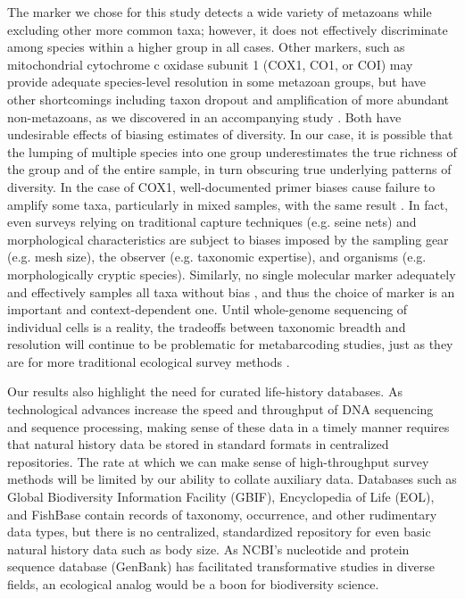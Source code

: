 \documentclass[11pt,letterpaper]{article} %
\begin{document}
The marker we chose for this study detects a wide variety of metazoans while excluding other more common taxa; however, it does not effectively discriminate among species within a higher group in all cases.
Other markers, such as mitochondrial cytochrome c oxidase subunit 1 (COX1, CO1, or COI) may provide adequate species-level resolution in some metazoan groups, but have other shortcomings including taxon dropout \citep{Deagle2014} and amplification of more abundant non-metazoans, as we discovered in an accompanying study \citep{Kelly2016FMS}.
Both have undesirable effects of biasing estimates of diversity.
In our case, it is possible that the lumping of multiple species into one group underestimates the true richness of the group and of the entire sample, in turn obscuring true underlying patterns of diversity.
In the case of COX1, well-documented primer biases cause failure to amplify some taxa, particularly in mixed samples, with the same result \citep{Deagle2014}.
In fact, even surveys relying on traditional capture techniques (e.g. seine nets) and morphological characteristics are subject to biases imposed by the sampling gear (e.g. mesh size), the observer (e.g. taxonomic expertise), and organisms (e.g. morphologically cryptic species).
Similarly, no single molecular marker adequately and effectively samples all taxa without bias  \citep{Drummond2015}, and thus the choice of marker is an important and context-dependent one.
Until whole-genome sequencing of individual cells is a reality, the tradeoffs between taxonomic breadth and resolution will continue to be problematic for metabarcoding studies, just as they are for more traditional ecological survey methods \citep{Kelly2016FMS}.

Our results also highlight the need for curated life-history databases. As technological advances increase the speed and throughput of DNA sequencing and sequence processing, making sense of these data in a timely manner requires that natural history data be stored in standard formats in centralized repositories. The rate at which we can make sense of high-throughput survey methods will be limited by our ability to collate auxiliary data. Databases such as Global Biodiversity Information Facility (GBIF), Encyclopedia of Life (EOL), and FishBase \citep{eol,  fishbase} contain records of taxonomy, occurrence, and other rudimentary data types, but there is no centralized, standardized repository for even basic natural history data such as body size. As NCBI's nucleotide and protein sequence database (GenBank) has facilitated transformative studies in diverse fields, an ecological analog would be a boon for biodiversity science.
\end{document}
